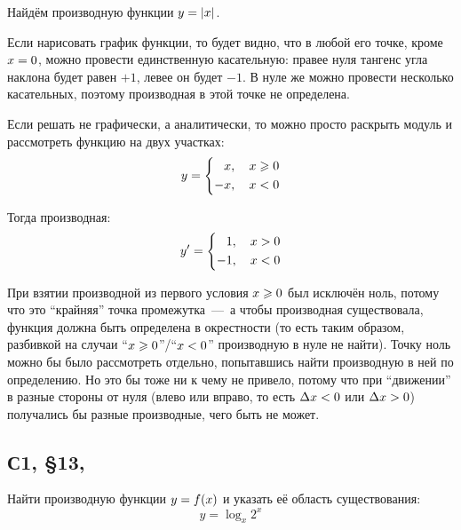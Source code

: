 \documentclass[a4paper,12pt]{article}
\begin{document}
  \begin{example}
    Найдём производную функции $y \hm= |x|$.
    
    Если нарисовать график функции, то будет видно, что в любой его точке, кроме $x \hm= 0$, можно провести единственную касательную: правее нуля тангенс угла наклона будет равен $+1$, левее он будет $-1$.
    В нуле же можно провести несколько касательных, поэтому производная в этой точке не определена.
    
    Если решать не графически, а аналитически, то можно просто раскрыть модуль и рассмотреть функцию на двух участках:
    \[
      y = \left\{
        \begin{aligned}
          &\hphantom{{+}}x,\quad x \geq 0\\
          &{-}x,\quad x < 0
        \end{aligned}
      \right.
    \]
    
    Тогда производная:
    \[
      y' = \left\{
        \begin{aligned}
          &\hphantom{{+}}1,\quad x > 0\\
          &{-}1,\quad x < 0
        \end{aligned}
      \right.
    \]
    
    При взятии производной из первого условия $x \hm\geq 0$ был исключён ноль, потому что это ``крайняя'' точка промежутка~---~а чтобы производная существовала, функция должна быть определена в окрестности (то есть таким образом, разбивкой на случаи ``$x \hm\geq 0$''/``$x \hm< 0$'' производную в нуле не найти).
    Точку ноль можно бы было рассмотреть отдельно, попытавшись найти производную в ней по определению.
    Но это бы тоже ни к чему не привело, потому что при ``движении'' в разные стороны от нуля (влево или вправо, то есть $\Dt x \hm< 0$ или $\Dt x \hm> 0$) получались бы разные производные, чего быть не может.
  \end{example}
  
  
  \subsection{С1, \S 13, }
  
  Найти производную функции $y \hm= f(x)$ и указать её область существования: %
  \[
    y = \log_x 2^x
  \]
  
\end{document}
